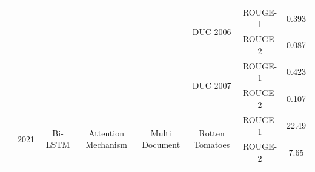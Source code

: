 \documentclass[12pt, a4paper, oneside]{report}
\begin{document}
\begin{tiny}
\begin{latin}
\begin{longtable}{|c|c|c|c|c|c|cc|}
                                                                              &                       &                                   &                                         &                                                                                                        & \multirow{2}{*}{DUC 2006}             & \multicolumn{1}{c|}{ROUGE-1}                                                                                                       & 0.393  \\ \cline{7-8} 
                                                                              &                       &                                   &                                         &                                                                                                        &                                       & \multicolumn{1}{c|}{ROUGE-2}                                                                                                       & 0.087  \\ \cline{6-8} 
                                                                              &                       &                                   &                                         &                                                                                                        & \multirow{2}{*}{DUC 2007}             & \multicolumn{1}{c|}{ROUGE-1}                                                                                                       & 0.423  \\ \cline{7-8} 
                                                                              &                       &                                   &                                         &                                                                                                        &                                       & \multicolumn{1}{c|}{ROUGE-2}                                                                                                       & 0.107  \\ \hline
        \multirow{3}{*}{\cite{amplayo2021informative}}       & \multirow{3}{*}{2021} & \multirow{3}{*}{Bi-LSTM}          & \multirow{3}{*}{Attention Mechanism}    & \multirow{3}{*}{Multi Document}                                                                        & \multirow{3}{*}{Rotten Tomatoes}      & \multicolumn{1}{c|}{ROUGE-1}                                                                                                       & 22.49  \\ \cline{7-8} 
                                                                              &                       &                                   &                                         &                                                                                                        &                                       & \multicolumn{1}{c|}{ROUGE-2}                                                                                                       & 7.65   \\ \cline{7-8} 

\end{longtable}
\end{latin}
\end{tiny}
\end{document}
